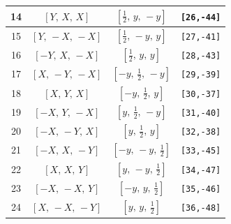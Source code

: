 \documentclass[fleqn,8pt]{jsarticle}
\begin{document}
\begin{longtable}{cccc}
14 & $\left[ Y,\, X,\, X \right]$ & $\left[ \frac{1}{2},\, y,\, - y \right]$ & {\tt [26,-44]} \\ \hline
15 & $\left[ Y,\, - X,\, - X \right]$ & $\left[ \frac{1}{2},\, - y,\, y \right]$ & {\tt [27,-41]} \\ \hline
16 & $\left[ - Y,\, X,\, - X \right]$ & $\left[ \frac{1}{2},\, y,\, y \right]$ & {\tt [28,-43]} \\ \hline
17 & $\left[ X,\, - Y,\, - X \right]$ & $\left[ - y,\, \frac{1}{2},\, - y \right]$ & {\tt [29,-39]} \\ \hline
18 & $\left[ X,\, Y,\, X \right]$ & $\left[ - y,\, \frac{1}{2},\, y \right]$ & {\tt [30,-37]} \\ \hline
19 & $\left[ - X,\, Y,\, - X \right]$ & $\left[ y,\, \frac{1}{2},\, - y \right]$ & {\tt [31,-40]} \\ \hline
20 & $\left[ - X,\, - Y,\, X \right]$ & $\left[ y,\, \frac{1}{2},\, y \right]$ & {\tt [32,-38]} \\ \hline
21 & $\left[ - X,\, X,\, - Y \right]$ & $\left[ - y,\, - y,\, \frac{1}{2} \right]$ & {\tt [33,-45]} \\ \hline
22 & $\left[ X,\, X,\, Y \right]$ & $\left[ y,\, - y,\, \frac{1}{2} \right]$ & {\tt [34,-47]} \\ \hline
23 & $\left[ - X,\, - X,\, Y \right]$ & $\left[ - y,\, y,\, \frac{1}{2} \right]$ & {\tt [35,-46]} \\ \hline
24 & $\left[ X,\, - X,\, - Y \right]$ & $\left[ y,\, y,\, \frac{1}{2} \right]$ & {\tt [36,-48]} \\
\end{longtable}
\renewcommand{\arraystretch}{1.2}
\end{document}

